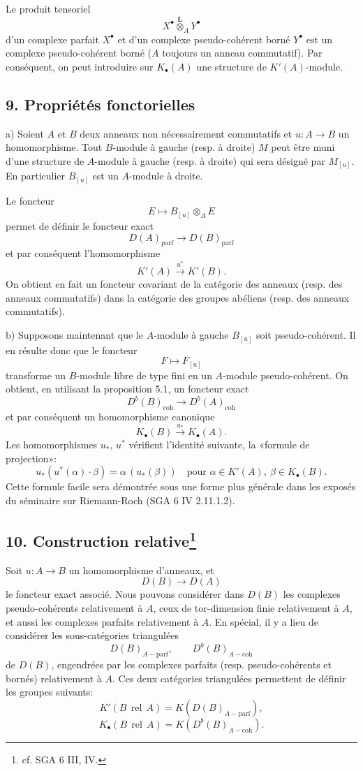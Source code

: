 \documentclass[11pt]{article}
\providecommand{\parf}{\mathrm{parf}}
\providecommand{\coh}{\mathrm{coh}}
\providecommand{\parf}{\mathrm{parf}}
\providecommand{\coh}{\mathrm{coh}}
\begin{document}
Le produit tensoriel
\[
X^\bullet\overset{\mathbf L}{\otimes}_A Y^\bullet
\]
d'un complexe parfait $X^\bullet$ et d'un complexe pseudo-cohérent borné $Y^\bullet$ est un complexe pseudo-cohérent borné ($A$ toujours un anneau commutatif). Par conséquent, on peut introduire sur $K_\bullet(A)$ une structure de $K'(A)$-module.

\subsection*{9. Propriétés fonctorielles}

a) Soient $A$ et $B$ deux anneaux non nécessairement commutatifs et $u:A\to B$ un homomorphisme. Tout $B$-module à gauche (resp. à droite) $M$ peut être muni d'une structure de $A$-module à gauche (resp. à droite) qui sera désigné par $M_{[u]}$. En particulier $B_{[u]}$ est un $A$-module à droite.

Le foncteur
\[
E\longmapsto B_{[u]}\otimes_A E
\]
permet de définir le foncteur exact
\[
D(A)_{\parf}\longrightarrow D(B)_{\parf}
\]
et par conséquent l'homomorphisme
\[
K'(A)\xrightarrow{u^*}K'(B).
\]
On obtient en fait un foncteur covariant de la catégorie des anneaux (resp. des anneaux commutatifs) dans la catégorie des groupes abéliens (resp. des anneaux commutatifs).

b) Supposons maintenant que le $A$-module à gauche $B_{[u]}$ soit pseudo-cohérent. Il en résulte donc que le foncteur
\[
F\longmapsto F_{[u]}
\]
transforme un $B$-module libre de type fini en un $A$-module pseudo-cohérent. On obtient, en utilisant la proposition 5.1, un foncteur exact
\[
D^b(B)_{\coh}\longrightarrow D^b(A)_{\coh}
\]
et par conséquent un homomorphisme canonique
\[
K_\bullet(B)\xrightarrow{u_*}K_\bullet(A).
\]
Les homomorphismes $u_*$, $u^*$ vérifient l'identité suivante, la «formule de projection»:
\[
u_*(u^*(\alpha)\cdot \beta)=\alpha\,(u_*(\beta))
\quad\text{pour }\alpha\in K'(A),\ \beta\in K_\bullet(B).
\]
Cette formule facile sera démontrée sous une forme plus générale dans les exposés du séminaire sur Riemann-Roch (SGA 6 IV 2.11.1.2).

\subsection*{10. Construction relative\footnote{cf. SGA 6 III, IV.}}

Soit $u:A\to B$ un homomorphisme d'anneaux, et
\[
D(B)\longrightarrow D(A)
\]
le foncteur exact associé. Nous pouvons considérer dans $D(B)$ les complexes pseudo-cohérents relativement à $A$, ceux de tor-dimension finie relativement à $A$, et aussi les complexes parfaits relativement à $A$. En spécial, il y a lieu de considérer les sous-catégories triangulées
\[
D(B)_{A-\parf},\qquad D^b(B)_{A-\coh}
\]
de $D(B)$, engendrées par les complexes parfaits (resp. pseudo-cohérents et bornés) relativement à $A$. Ces deux catégories triangulées permettent de définir les groupes suivants:
\[
K'(B\operatorname{\,rel\,}A)=K(D(B)_{A-\parf}),
\]
\[
K_\bullet(B\operatorname{\,rel\,}A)=K(D^b(B)_{A-\coh}).
\]
\end{document}
